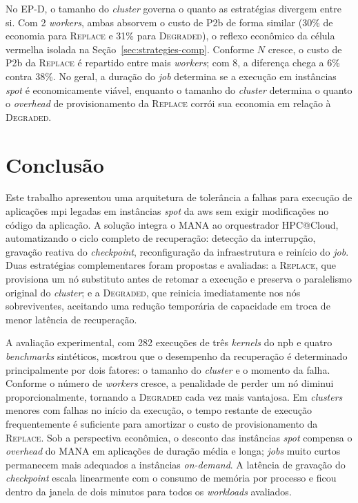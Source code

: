 \documentclass[a4paper,11pt]{article}
\begin{document}
            No EP-D, o tamanho do \textit{cluster} governa o quanto as estratégias
            divergem entre si. Com 2 \textit{workers}, ambas absorvem o custo de P2b
            de forma similar (30\% de economia para \textsc{Replace} e 31\% para
            \textsc{Degraded}), o reflexo econômico da célula vermelha isolada na
            Seção~\ref{sec:strategies-comp}. Conforme $N$ cresce, o custo de P2b da
            \textsc{Replace} é repartido entre mais \textit{workers}; com 8, a diferença
            chega a 6\% contra 38\%. No geral, a duração do \textit{job} determina se
            a execução em instâncias \textit{spot} é economicamente viável, enquanto o
            tamanho do \textit{cluster} determina o quanto o \textit{overhead} de
            provisionamento da \textsc{Replace} corrói sua economia em relação à
            \textsc{Degraded}.

    \section{Conclusão}
    \label{sec:conclusao}

        Este trabalho apresentou uma arquitetura de tolerância a falhas para
        execução de aplicações \gls{mpi} legadas em instâncias \textit{spot} da
        \gls{aws} sem exigir modificações no código da aplicação. A solução
        integra o MANA ao orquestrador HPC@Cloud, automatizando o ciclo completo
        de recuperação: detecção da interrupção, gravação reativa do
        \textit{checkpoint}, reconfiguração da infraestrutura e reinício do
        \textit{job}. Duas estratégias complementares foram propostas e avaliadas:
        a \textsc{Replace}, que provisiona um nó substituto antes de retomar a
        execução e preserva o paralelismo original do \textit{cluster}; e a
        \textsc{Degraded}, que reinicia imediatamente nos nós sobreviventes,
        aceitando uma redução temporária de capacidade em troca de menor latência
        de recuperação.

        A avaliação experimental, com 282 execuções de três \textit{kernels} do
        \gls{npb} e quatro \textit{benchmarks} sintéticos, mostrou que o
        desempenho da recuperação é determinado principalmente por dois fatores: o
        tamanho do \textit{cluster} e o momento da falha. Conforme o número de
        \textit{workers} cresce, a penalidade de perder um nó diminui
        proporcionalmente, tornando a \textsc{Degraded} cada vez mais vantajosa.
        Em \textit{clusters} menores com falhas no início da execução, o tempo restante de
        execução frequentemente é suficiente para amortizar o custo de
        provisionamento da \textsc{Replace}. Sob a perspectiva econômica, o
        desconto das instâncias \textit{spot} compensa o \textit{overhead} do MANA
        em aplicações de duração média e longa; \textit{jobs} muito curtos
        permanecem mais adequados a instâncias \textit{on-demand}. A latência de
        gravação do \textit{checkpoint} escala linearmente com o consumo de memória
        por processo e ficou dentro da janela de dois minutos para todos os
        \textit{workloads} avaliados.
\end{document}
